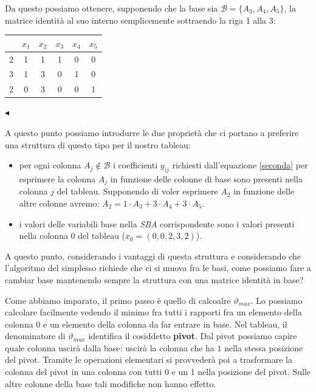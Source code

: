 \documentclass[11pt]{book}
\begin{document}
Da questo possiamo ottenere, supponendo che la base sia
$\mathcal{B}=\{A_3, A_4, A_5\}$, la matrice identit\`a al suo interno
semplicemente sottraendo la riga 1 alla 3:

\begin{center}
  
  \begin{tabular}{c|ccccc}
    & $x_1$ & $x_2$ & $x_3$ & $x_4$ & $x_5$ \\\hline
    2 & 1 & 1 & 1 & 0 & 0 \\
    3 & 1 & 3& 0 & 1& 0 \\
    2 & 0 & 3 & 0 & 0 & 1 \\
  \end{tabular}

\end{center}
$\blacktriangleleft$
\linebreak\vspace{11pt}

A questo punto possiamo introdurre le due propriet\`a che ci portano a
preferire una struttura di questo tipo per il nostro tableau:

\begin{itemize}
  
\item per ogni colonna $A_j \not\in \mathcal{B}$ i coefficienti
  $y_{ij}$ richiesti dall'equazione \ref{seconda} per esprimere la
  colonna $A_j$ in funzione delle colonne di base sono  presenti nella
  colonna $j$ del tableau. Supponendo di voler esprimere $A_2$ in
  funzione delle altre colonne avremo: $A_2 = 1\cdot A_3 + 3\cdot A_4
  + 3\cdot A_5$.

\item i valori delle variabili base nella {\em SBA} corrispondente
  sono i valori presenti nella colonna 0 del tableau ($x_0 =
  (0,0,2,3,2)$).

\end{itemize}

A questo punto, considerando i vantaggi di questa struttura e
considerando che l'algoritmo del simplesso richiede che ci si muova
fra le basi, come possiamo fare a cambiar base mantenendo sempre la
struttura con una matrice identit\`a in base?

Come abbiamo imparato, il primo passo \`e quello di calcoalre
$\vartheta_{max}$. Lo possiamo calcolare facilmente vedendo il minimo
fra tutti i rapporti fra un elemento della colonna $0$ e un elemento
della colonna da far entrare in base. Nel tableau, il denominatore di
$\vartheta_{max}$ identifica il cosiddetto {\bf pivot}. Dal pivot
possiamo capire quale colonna uscir\`a dalla base: uscir\`a la colonna
che ha $1$ nella stessa posizione del pivot. Tramite le operazioni
elementari si provveder\`a poi a trasformare la colonna del pivot in
una colonna con tutti 0 e un 1 nella posizione del pivot. Sulle altre
colonne della base tali modifiche non hanno effetto.
\end{document}
